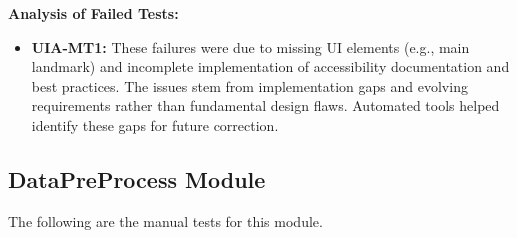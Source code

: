 \documentclass[12pt, titlepage]{article}
\begin{document}
\textbf{Analysis of Failed Tests:}
\begin{itemize}
  \item \textbf{UIA-MT1: } These failures were due to missing UI
    elements (e.g., main landmark) and
    incomplete implementation of accessibility documentation and best
    practices. The issues stem from
    implementation gaps and evolving requirements rather than
    fundamental design flaws. Automated tools
    helped identify these gaps for future correction.
\end{itemize}

\subsection{DataPreProcess Module}
The following are the manual tests for this module.
\end{document}
